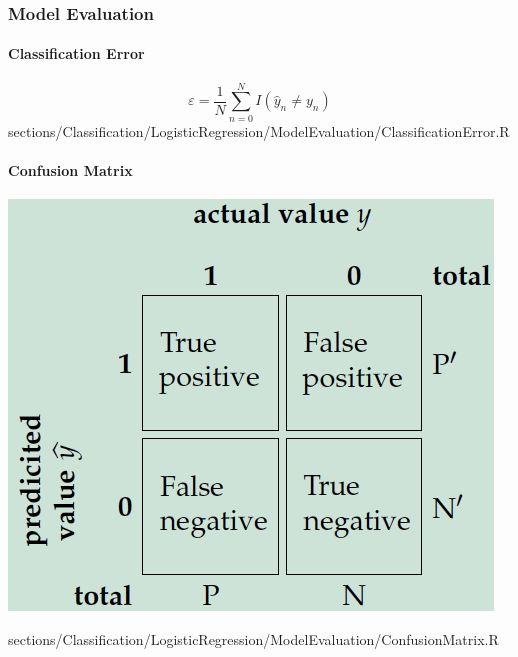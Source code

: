 \subsubsection{Model Evaluation}
	\paragraph{Classification Error}
		\RTheory
		{
			$$\varepsilon = \frac{1}{N}\sum\limits_{n = 0}^N I(\hat{y}_n \neq y_n)$$
		}
		{
			sections/Classification/LogisticRegression/ModelEvaluation/ClassificationError.R
		}
		
	\paragraph{Confusion Matrix}
		\RTheory
		{
			\vspace{0pt}
			
			\includegraphics{images/ConfusionMatrix.png}
		}
		{
			sections/Classification/LogisticRegression/ModelEvaluation/ConfusionMatrix.R
		}
		
